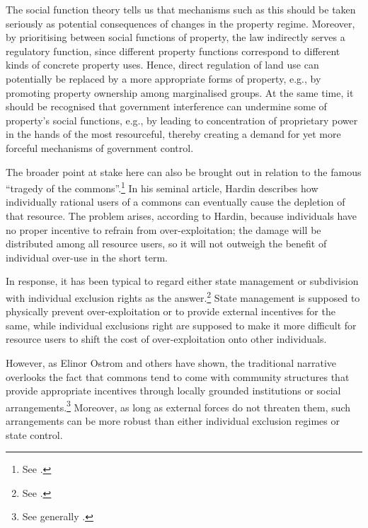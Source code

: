 The social function theory tells us that mechanisms such as this should be taken seriously as potential consequences of changes in the property regime. Moreover, by prioritising between social functions of property, the law indirectly serves a regulatory function, since different property functions correspond to different kinds of concrete property uses. Hence, direct regulation of land use can potentially be replaced by a more appropriate forms of property, e.g., by promoting property ownership among marginalised groups. At the same time, it should be recognised that government interference can undermine some of property's social functions, e.g., by leading to concentration of proprietary power in the hands of the most resourceful, thereby creating a demand for yet more forceful mechanisms of government control.

The broader point at stake here can also be brought out in relation to the famous ``tragedy of the commons''.\footnote{See \cite{hardin68}.} In his seminal article, Hardin describes how individually rational users of a commons can eventually cause the depletion of that resource. The problem arises, according to Hardin, because individuals have no proper incentive to refrain from over-exploitation; the damage will be distributed among all resource users, so it will not outweigh the benefit of individual over-use in the short term.

In response, it has been typical to regard either state management or subdivision with individual exclusion rights as the answer.\footnote{See \cite[8-13]{ostrom90}.} State management is supposed to physically prevent over-exploitation or to provide external incentives for the same, while individual exclusions right are supposed to make it more difficult for resource users to shift the cost of over-exploitation onto other individuals.%

However, as Elinor Ostrom and others have shown, the traditional narrative overlooks the fact that commons tend to come with community structures that provide appropriate incentives through locally grounded institutions or social arrangements.\footnote{See generally \cite{ostrom90}.} Moreover, as long as external forces do not threaten them, such arrangements can be more robust than either 
individual exclusion regimes or state control.

